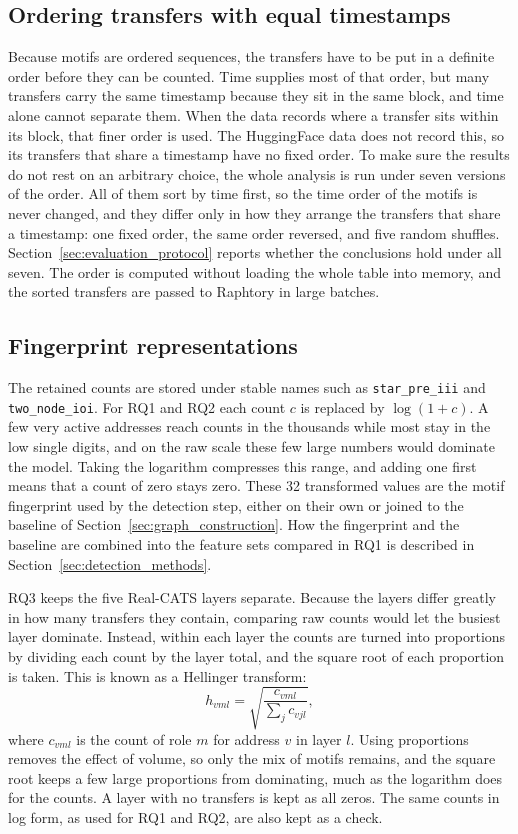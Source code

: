 \documentclass{thesisclass}
\begin{document}
\subsection{Ordering transfers with equal timestamps}

Because motifs are ordered sequences, the transfers have to be put in a definite
order before they can be counted. Time supplies most of that order, but many
transfers carry the same timestamp because they sit in the same block, and time
alone cannot separate them. When the data records where a transfer sits within its
block, that finer order is used. The HuggingFace data does not record this, so its
transfers that share a timestamp have no fixed order. To make sure the results do
not rest on an arbitrary choice, the whole analysis is run under seven versions of
the order. All of them sort by time first, so the time order of the motifs is
never changed, and they differ only in how they arrange the transfers that share a
timestamp: one fixed order, the same order reversed, and five random shuffles.
Section~\ref{sec:evaluation_protocol} reports whether the conclusions hold under
all seven. The order is computed without loading the whole table into memory, and
the sorted transfers are passed to Raphtory in large batches.

\subsection{Fingerprint representations}

The retained counts are stored under stable names such as \texttt{star\_pre\_iii}
and \texttt{two\_node\_ioi}. For RQ1 and RQ2 each count $c$ is replaced by
$\log(1+c)$. A few very active addresses reach counts in the thousands while most
stay in the low single digits, and on the raw scale these few large numbers would
dominate the model. Taking the logarithm compresses this range, and adding one
first means that a count of zero stays zero. These 32 transformed values are the
motif fingerprint used by the detection step, either on their own or joined to the
baseline of Section~\ref{sec:graph_construction}. How the fingerprint and the baseline are
combined into the feature sets compared in RQ1 is described in
Section~\ref{sec:detection_methods}.

RQ3 keeps the five Real-CATS layers separate. Because the layers differ greatly
in how many transfers they contain, comparing raw counts would let the busiest
layer dominate. Instead, within each layer the counts are turned into proportions by dividing each
count by the layer total, and the square root of each proportion is taken. This is
known as a Hellinger transform:
\[
    h_{vml} = \sqrt{\frac{c_{vml}}{\sum_j c_{vjl}}},
\]
where $c_{vml}$ is the count of role $m$ for address $v$ in layer $l$. Using
proportions removes the effect of volume, so only the mix of motifs remains, and
the square root keeps a few large proportions from dominating, much as the
logarithm does for the counts. A layer with no transfers is kept as all zeros. The
same counts in log form, as used for RQ1 and RQ2, are also kept as a check.
\end{document}
